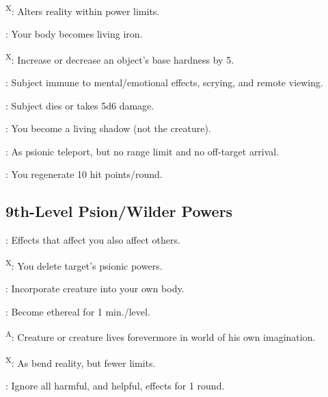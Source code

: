 \textsuperscript{X}: Alters reality within power limits.

: Your body becomes living iron.

\textsuperscript{X}: Increase or decrease an object's base hardness by 5.

: Subject immune to mental/emotional effects, scrying, and remote viewing.

: Subject dies or takes 5d6 damage.

: You become a living shadow (not the creature).

: As psionic teleport, but no range limit and no off-target arrival.

: You regenerate 10 hit points/round.




\subsection{9th-Level Psion/Wilder Powers}

: Effects that affect you also affect others.

\textsuperscript{X}: You delete target's psionic powers.

: Incorporate creature into your own body.

: Become ethereal for 1 min./level.

\textsuperscript{A}: Creature or creature lives forevermore in world of his own imagination.

\textsuperscript{X}: As bend reality, but fewer limits.

: Ignore all harmful, and helpful, effects for 1 round.